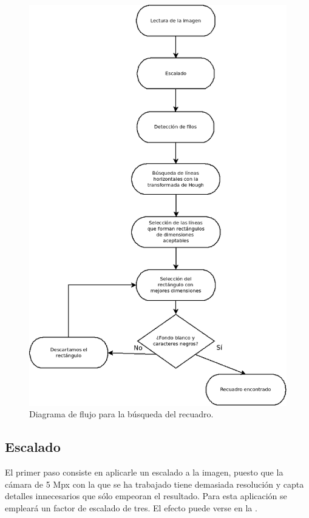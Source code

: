 \begin{figure}[!h]
\centering
\includegraphics[width=12cm]{DiagramaProyecto.png}
\caption{\small{Diagrama de flujo para la búsqueda del recuadro.}}
\label{diagrecuadro}
\end{figure} 

\subsection{Escalado}
El primer paso consiste en aplicarle un escalado a la imagen, puesto que la cámara de 5 Mpx con la que se ha trabajado tiene demasiada resolución y capta detalles innecesarios que sólo empeoran el resultado. Para esta aplicación se empleará un factor de escalado de tres. El efecto puede verse en la .

